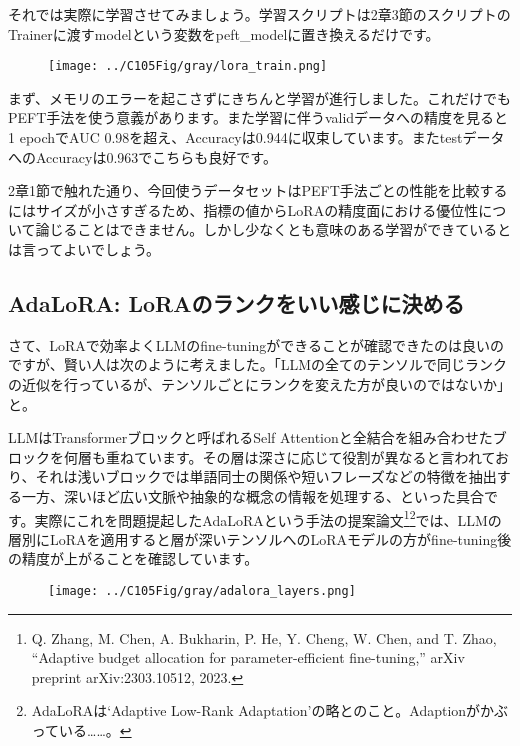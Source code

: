 \documentclass[a5paper,twoside,dvipdfmx]{jsarticle}
\begin{document}
それでは実際に学習させてみましょう。学習スクリプトは2章3節のスクリプトのTrainerに渡すmodelという変数をpeft\_modelに置き換えるだけです。

\begin{figure}[h]
  \centering
  \texttt{[image: ../C105Fig/gray/lora\_train.png]}
 \end{figure} 


まず、メモリのエラーを起こさずにきちんと学習が進行しました。これだけでもPEFT手法を使う意義があります。また学習に伴うvalidデータへの精度を見ると1 epochでAUC 0.98を超え、Accuracyは0.944に収束しています。またtestデータへのAccuracyは0.963でこちらも良好です。

2章1節で触れた通り、今回使うデータセットはPEFT手法ごとの性能を比較するにはサイズが小さすぎるため、指標の値からLoRAの精度面における優位性について論じることはできません。しかし少なくとも意味のある学習ができているとは言ってよいでしょう。

\subsection{AdaLoRA: LoRAのランクをいい感じに決める}

さて、LoRAで効率よくLLMのfine-tuningができることが確認できたのは良いのですが、賢い人は次のように考えました。「LLMの全てのテンソルで同じランクの近似を行っているが、テンソルごとにランクを変えた方が良いのではないか」と。

LLMはTransformerブロックと呼ばれるSelf Attentionと全結合を組み合わせたブロックを何層も重ねています。その層は深さに応じて役割が異なると言われており、それは浅いブロックでは単語同士の関係や短いフレーズなどの特徴を抽出する一方、深いほど広い文脈や抽象的な概念の情報を処理する、といった具合です。実際にこれを問題提起した\textsf{AdaLoRA}という手法の提案論文\footnote{Q. Zhang, M. Chen, A. Bukharin, P. He, Y. Cheng, W. Chen, and  T. Zhao, “Adaptive budget allocation for parameter-efficient fine-tuning,” arXiv preprint arXiv:2303.10512, 2023. }\footnote{AdaLoRAは`Adaptive Low-Rank Adaptation'の略とのこと。Adaptionがかぶっている……。}では、LLMの層別にLoRAを適用すると層が深いテンソルへのLoRAモデルの方がfine-tuning後の精度が上がることを確認しています。

\newpage

\begin{figure}[h]
  \centering
  \texttt{[image: ../C105Fig/gray/adalora\_layers.png]}
 \end{figure} 
\end{document}
